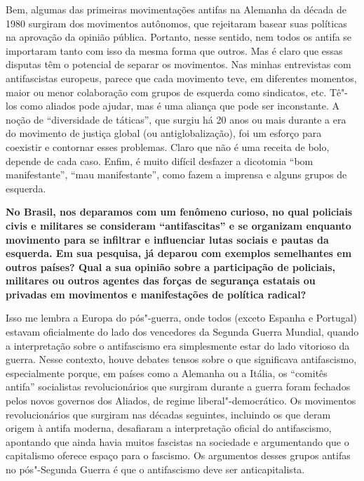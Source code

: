Bem, algumas das primeiras movimentações antifas na Alemanha da década de 1980 surgiram dos movimentos autônomos, que rejeitaram basear suas políticas na aprovação da opinião pública. Portanto, nesse sentido, nem todos os antifa se importaram tanto com isso da mesma forma que outros. Mas é claro que essas disputas têm o potencial de separar os movimentos. Nas minhas entrevistas com antifascistas europeus, parece que cada movimento teve, em diferentes momentos, maior ou menor colaboração com grupos de esquerda como sindicatos, etc. Tê"-los como aliados pode ajudar, mas é uma aliança que  pode ser inconstante. A noção de ``diversidade de táticas'', que surgiu há 20 anos ou mais durante a era do movimento  de justiça global (ou antiglobalização), foi um esforço para coexistir e contornar esses problemas. Claro que não é uma receita de bolo, depende de cada caso. Enfim, é muito difícil desfazer a dicotomia ``bom manifestante'', ``mau manifestante'', como fazem a imprensa e alguns grupos de esquerda. 
 
\bigskip

\noindent{}\textbf{No Brasil, nos deparamos com um fenômeno curioso, no qual policiais civis e militares se consideram ``antifascitas'' e se organizam enquanto movimento para se infiltrar e influenciar lutas sociais e pautas da esquerda. Em sua pesquisa, já deparou com exemplos semelhantes em outros países? Qual a sua opinião sobre a participação de policiais, militares ou outros agentes das forças de segurança estatais ou privadas em movimentos e manifestações de política radical?}
 
Isso me lembra a Europa do pós"-guerra, onde todos (exceto Espanha e Portugal) estavam oficialmente do lado dos vencedores da Segunda Guerra Mundial, quando a interpretação sobre o antifascismo era simplesmente estar do lado vitorioso da guerra. Nesse contexto, houve debates tensos sobre o que significava antifascismo, especialmente porque, em países como a Alemanha ou a Itália, os ``comitês antifa'' socialistas revolucionários que surgiram durante a guerra foram fechados pelos novos governos dos Aliados, de regime liberal"-democrático. Os movimentos revolucionários que surgiram nas décadas seguintes, incluindo os que deram origem à antifa moderna, desafiaram a interpretação oficial do antifascismo, apontando que ainda havia muitos fascistas na sociedade e argumentando que o capitalismo oferece espaço para o fascismo. Os argumentos desses grupos antifas no pós"-Segunda Guerra é que o antifascismo deve ser anticapitalista. 
 
